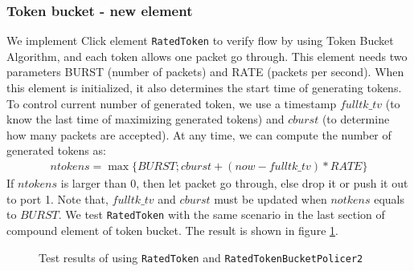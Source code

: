\documentclass[a4paper]{article}
\begin{document}
  \subsubsection{Token bucket - new element}
  We implement Click element \texttt{RatedToken} to verify flow by using Token Bucket Algorithm, and each token allows one packet go through. This element needs two parameters BURST (number of packets) and RATE (packets per second). When this element is initialized, it also determines the start time of generating tokens. To control current number of generated token, we use a timestamp $fulltk\_tv$ (to know the last time of maximizing generated tokens) and $cburst$ (to determine how many packets are accepted). At any time, we can compute the number of generated tokens as:
  \begin{align*}ntokens = \max\{BURST; cburst + (now - fulltk\_tv)*RATE\}\end{align*}
  If $ntokens$ is larger than 0, then let packet go through, else drop it or push it out to port 1. Note that, $fulltk\_tv$ and $cburst$ must be updated when $notkens$ equals to $BURST$. We test \texttt{RatedToken} with the same scenario in the last section of compound element of token bucket. The result is shown in figure \ref{fig:test-tk-element}.
  \begin{figure}
      \centering
      \caption{Test results of using \texttt{RatedToken} and \texttt{RatedTokenBucketPolicer2}}
      \label{fig:test-tk-element}
  \end{figure}
\end{document}
